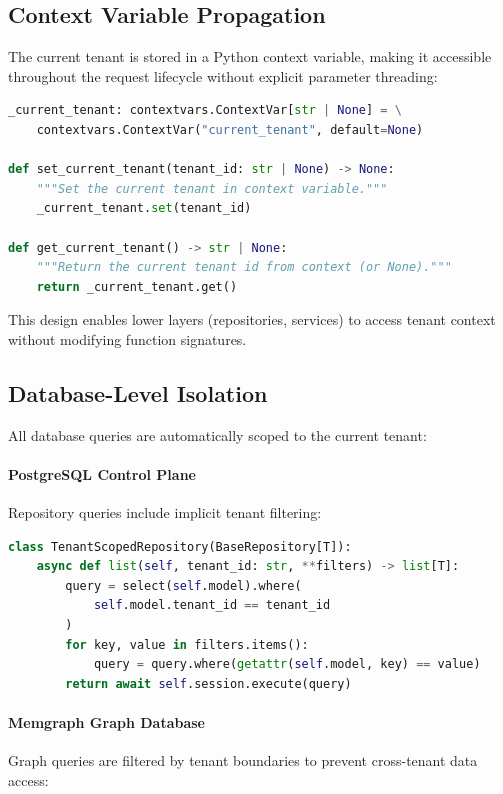 \subsection{Context Variable Propagation}
\label{subsec:tenant-context}

The current tenant is stored in a Python context variable, making it accessible throughout the request lifecycle without explicit parameter threading:

\begin{lstlisting}[language=Python,caption={Tenant context variable management}]
_current_tenant: contextvars.ContextVar[str | None] = \
    contextvars.ContextVar("current_tenant", default=None)

def set_current_tenant(tenant_id: str | None) -> None:
    """Set the current tenant in context variable."""
    _current_tenant.set(tenant_id)

def get_current_tenant() -> str | None:
    """Return the current tenant id from context (or None)."""
    return _current_tenant.get()
\end{lstlisting}

This design enables lower layers (repositories, services) to access tenant context without modifying function signatures.

\subsection{Database-Level Isolation}
\label{subsec:db-isolation}

All database queries are automatically scoped to the current tenant:

\paragraph{PostgreSQL Control Plane}
Repository queries include implicit tenant filtering:

\begin{lstlisting}[language=Python,caption={Tenant-scoped database query example}]
class TenantScopedRepository(BaseRepository[T]):
    async def list(self, tenant_id: str, **filters) -> list[T]:
        query = select(self.model).where(
            self.model.tenant_id == tenant_id
        )
        for key, value in filters.items():
            query = query.where(getattr(self.model, key) == value)
        return await self.session.execute(query)
\end{lstlisting}

\paragraph{Memgraph Graph Database}
Graph queries are filtered by tenant boundaries to prevent cross-tenant data access:

